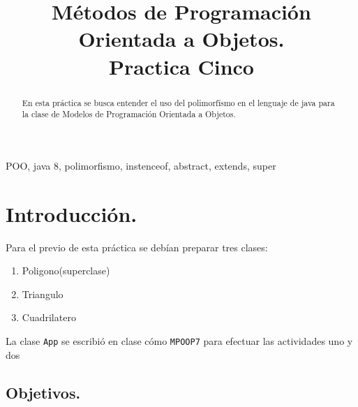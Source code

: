 \documentclass[conference]{IEEEtran}
\begin{document}
\title{Métodos de  Programación Orientada a Objetos.\\
    {\footnotesize Practica Cinco}}


\author{
    \and
}\maketitle

\begin{abstract}
    En esta práctica se busca entender el uso del polimorfísmo en el lenguaje 
    de java para la clase de Modelos de Programación Orientada a Objetos.
\end{abstract}
    
\begin{IEEEkeywords}
    POO, java 8, polimorfismo, instenceof, abstract, extends, super
\end{IEEEkeywords}



\section{Introducción.}

    Para el previo de esta práctica se debían preparar tres clases:
    
    \begin{enumerate}
        \item Poligono(superclase)
        \item Triangulo
        \item Cuadrilatero
    \end{enumerate}
    
    La clase \texttt{App} se escribió en clase cómo \texttt{MPOOP7}  para efectuar las actividades uno y dos 
    \subsection{Objetivos.}
\end{document}
